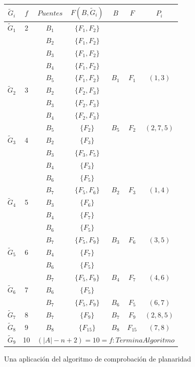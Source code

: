 \documentclass[10pt,a5paper]{book}
\begin{document}
\begin{figure}[H]
\caption{ Una aplicación del algoritmo de comprobación de planaridad}
\begin{tabular}{|c|c|c|c|c|c|c|}
\hline
$\widetilde{G}_i$ & $f$ & $Puentes$ & $F(B,\widetilde{G}_i)$ & $B$ & $F$ & $P_i$ \\
\hline
$\widetilde{G}_1$ & 2 & $B_1$ & $\{F_1,F_2\}$ & & & \\
& & $B_2$ & $\{F_1,F_2\}$ & & & \\
& & $B_3$ & $\{F_1,F_2\}$ & & & \\
& & $B_4$ & $\{F_1,F_2\}$ & & & \\
& & $B_5$ & $\{F_1,F_2\}$ & $B_1$ & $F_1$ & $(1,3)$ \\
\hline
$\widetilde{G}_2$ & 3 & $B_2$ & $\{F_2,F_3\}$ & & & \\
& & $B_3$ & $\{F_2,F_3\}$ & & & \\
& & $B_4$ & $\{F_2,F_3\}$ & & & \\
& & $B_5$ & $\{F_2\}$ & $B_5$ & $F_2$ & $(2, 7, 5)$\\
\hline
$\widetilde{G}_3$ & 4 & $B_2$ & $\{F_3\}$ & & & \\
& & $B_3$ & $\{F_3,F_5\}$ & & & \\
& & $B_4$ & $\{F_3\}$ & & & \\
& & $B_6$ & $\{F_5\}$ & & & \\
& & $B_7$ & $\{F_5,F_6\}$ & $B_2$ & $F_3$ & $(1, 4)$\\
\hline
$\widetilde{G}_4$ & 5 & $B_3$ & $\{F_6\}$ & & & \\
& & $B_4$ & $\{F_7\}$ & & & \\
& & $B_6$ & $\{F_5\}$ & & & \\
& & $B_7$ & $\{F_5,F_9\}$ & $B_3$ & $F_6$ & $(3, 5)$ \\
\hline
$\widetilde{G}_5$ & 6 & $B_4$ & $\{F_7\}$ & & & \\
& & $B_6$ & $\{F_5\}$ & & & \\
& & $B_7$ & $\{F_5,F_9\}$ & $B_4$ & $F_7$ & $(4, 6)$ \\
\hline
$\widetilde{G}_6$ & 7 & $B_6$ & $\{F_5\}$ & & & \\
& & $B_7$ & $\{F_5,F_9\}$ & $B_6$ & $F_5$ & $(6, 7)$ \\
\hline
$\widetilde{G}_7$ & 8 & $B_7$ & $\{F_9\}$ & $B_7$ & $F_9$ & $(2, 8, 5)$ \\
\hline
$\widetilde{G}_8$ & 9 & $B_8$ & $\{F_{15}\}$ & $B_8$ & $F_{15}$ & $(7, 8)$ \\
\hline 
$\widetilde{G}_9$ & 10 & \multicolumn{5}{|c|}{$(|A| -n +2) = 10 = f: Termina Algoritmo$} \\

\end{tabular}
\end{figure}
\end{document}
